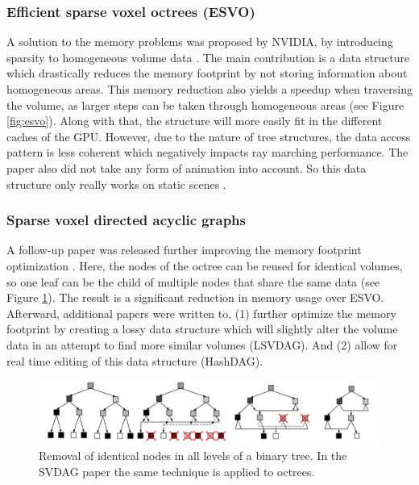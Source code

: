 \subsubsection{Efficient sparse voxel octrees (ESVO)} \label{related_work:voxel_data_structures:esvo}
A solution to the memory problems was proposed by NVIDIA, by introducing sparsity to homogeneous volume data \cite{laine2010efficient}. The main contribution is a data structure which drastically reduces the memory footprint by not storing information about homogeneous areas. This memory reduction also yields a speedup when traversing the volume, as larger steps can be taken through homogeneous areas (see Figure \ref{fig:esvo}). Along with that, the structure will more easily fit in the different caches of the GPU. However, due to the nature of tree structures, the data access pattern is less coherent which negatively impacts ray marching performance. The paper also did not take any form of animation into account. So this data structure only really works on static scenes \cite{JohnLinPerfectEngine}.


\subsubsection{Sparse voxel directed acyclic graphs} \label{related_work:voxel_data_structures:svdag}
A follow-up paper was released further improving the memory footprint optimization \cite{kampe2013high}. Here, the nodes of the octree can be reused for identical volumes, so one leaf can be the child of multiple nodes that share the same data (see Figure \ref{fig:DAG_node_deduplication}). The result is a significant reduction in memory usage over ESVO. Afterward, additional papers were written to, (1) further optimize the memory footprint by creating a lossy data structure which will slightly alter the volume data in an attempt to find more similar volumes \cite{van2020lossy} (LSVDAG). And (2) allow for real time editing of this data structure \cite{careil2020interactively} (HashDAG).

\begin{figure}
    \centering
    \includegraphics[width=\linewidth]{figures/DAG_node_deduplication.png}
    \caption{Removal of identical nodes in all levels of a binary tree. In the SVDAG paper the same technique is applied to octrees. \cite{kampe2013high}}
    \label{fig:DAG_node_deduplication}
\end{figure}
